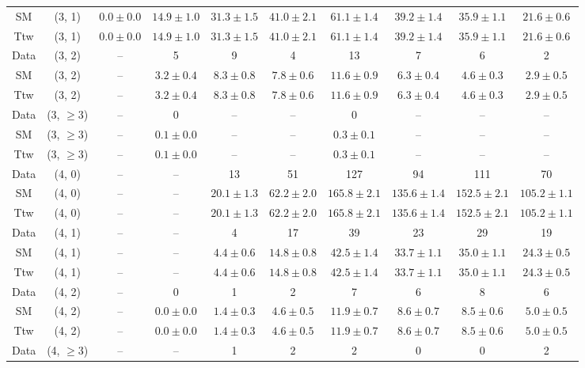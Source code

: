 \begin{table}[h!]
{\begin{tabular}{cccccccccc}
	SM & (3, 1) & $0.0\pm 0.0$ & $14.9\pm 1.0$ & $31.3\pm 1.5$ & $41.0\pm 2.1$ & $61.1\pm 1.4$ & $39.2\pm 1.4$ & $35.9\pm 1.1$ & $21.6\pm 0.6$ \\[0.5ex] 
	Ttw & (3, 1) & $0.0\pm 0.0$ & $14.9\pm 1.0$ & $31.3\pm 1.5$ & $41.0\pm 2.1$ & $61.1\pm 1.4$ & $39.2\pm 1.4$ & $35.9\pm 1.1$ & $21.6\pm 0.6$ \\[0.5ex] 
	Data & (3, 2) & -- & 5 & 9 & 4 & 13 & 7 & 6 & 2 \\[0.5ex] 
	SM & (3, 2) & -- & $3.2\pm 0.4$ & $8.3\pm 0.8$ & $7.8\pm 0.6$ & $11.6\pm 0.9$ & $6.3\pm 0.4$ & $4.6\pm 0.3$ & $2.9\pm 0.5$ \\[0.5ex] 
	Ttw & (3, 2) & -- & $3.2\pm 0.4$ & $8.3\pm 0.8$ & $7.8\pm 0.6$ & $11.6\pm 0.9$ & $6.3\pm 0.4$ & $4.6\pm 0.3$ & $2.9\pm 0.5$ \\[0.5ex] 
	Data & (3, $\ge3$) & -- & 0 & -- & -- & 0 & -- & -- & -- \\[0.5ex] 
	SM & (3, $\ge3$) & -- & $0.1\pm 0.0$ & -- & -- & $0.3\pm 0.1$ & -- & -- & -- \\[0.5ex] 
	Ttw & (3, $\ge3$) & -- & $0.1\pm 0.0$ & -- & -- & $0.3\pm 0.1$ & -- & -- & -- \\[0.5ex] 
	Data & (4, 0) & -- & -- & 13 & 51 & 127 & 94 & 111 & 70 \\[0.5ex] 
	SM & (4, 0) & -- & -- & $20.1\pm 1.3$ & $62.2\pm 2.0$ & $165.8\pm 2.1$ & $135.6\pm 1.4$ & $152.5\pm 2.1$ & $105.2\pm 1.1$ \\[0.5ex] 
	Ttw & (4, 0) & -- & -- & $20.1\pm 1.3$ & $62.2\pm 2.0$ & $165.8\pm 2.1$ & $135.6\pm 1.4$ & $152.5\pm 2.1$ & $105.2\pm 1.1$ \\[0.5ex] 
	Data & (4, 1) & -- & -- & 4 & 17 & 39 & 23 & 29 & 19 \\[0.5ex] 
	SM & (4, 1) & -- & -- & $4.4\pm 0.6$ & $14.8\pm 0.8$ & $42.5\pm 1.4$ & $33.7\pm 1.1$ & $35.0\pm 1.1$ & $24.3\pm 0.5$ \\[0.5ex] 
	Ttw & (4, 1) & -- & -- & $4.4\pm 0.6$ & $14.8\pm 0.8$ & $42.5\pm 1.4$ & $33.7\pm 1.1$ & $35.0\pm 1.1$ & $24.3\pm 0.5$ \\[0.5ex] 
	Data & (4, 2) & -- & 0 & 1 & 2 & 7 & 6 & 8 & 6 \\[0.5ex] 
	SM & (4, 2) & -- & $0.0\pm 0.0$ & $1.4\pm 0.3$ & $4.6\pm 0.5$ & $11.9\pm 0.7$ & $8.6\pm 0.7$ & $8.5\pm 0.6$ & $5.0\pm 0.5$ \\[0.5ex] 
	Ttw & (4, 2) & -- & $0.0\pm 0.0$ & $1.4\pm 0.3$ & $4.6\pm 0.5$ & $11.9\pm 0.7$ & $8.6\pm 0.7$ & $8.5\pm 0.6$ & $5.0\pm 0.5$ \\[0.5ex] 
	Data & (4, $\ge3$) & -- & -- & 1 & 2 & 2 & 0 & 0 & 2 \\[0.5ex] 

\end{tabular}}
\end{table}
